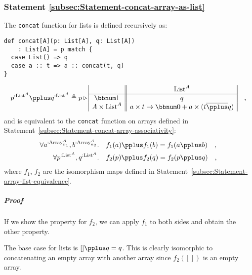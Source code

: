 \subsubsection{Statement \label{subsec:Statement-concat-array-as-list}\ref{subsec:Statement-concat-array-as-list}}

The \lstinline!concat! function for lists is defined recursively
as:
\begin{lstlisting}
def concat[A](p: List[A], q: List[A])
    : List[A] = p match {
  case List() => q
  case a :: t => a :: concat(t, q)
}
\end{lstlisting}
\[
p^{:\text{List}^{A}}\pplus q^{:\text{List}^{A}}\triangleq p\triangleright\begin{array}{|c||c|}
 & \text{List}^{A}\\
\hline \bbnum 1 & q\\
A\times\text{List}^{A} & a\times t\rightarrow\bbnum 0+a\times(t\overline{\pplus}q)
\end{array}\quad,
\]
and is equivalent to the \lstinline!concat! function on arrays defined
in Statement~\ref{subsec:Statement-concat-array-associativity}:
\begin{align*}
\forall a^{:\text{Array}_{n_{1}}^{A}},b^{:\text{Array}_{n_{2}}^{A}}.\quad & f_{1}(a)\pplus f_{1}(b)=f_{1}(a\pplus b)\quad,\\
\forall p^{:\text{List}^{A}},q^{:\text{List}^{A}}.\quad & f_{2}(p)\pplus f_{2}(q)=f_{2}(p\pplus q)\quad,
\end{align*}
where $f_{1}$, $f_{2}$ are the isomorphism maps defined in Statement~\ref{subsec:Statement-array-list-equivalence}.

\subparagraph{Proof}

If we show the property for $f_{2}$, we can apply $f_{1}$ to both
sides and obtain the other property.

The base case for lists is $[]\pplus q=q$. This is clearly isomorphic
to concatenating an empty array with another array since $f_{2}([])$
is an empty array. 

